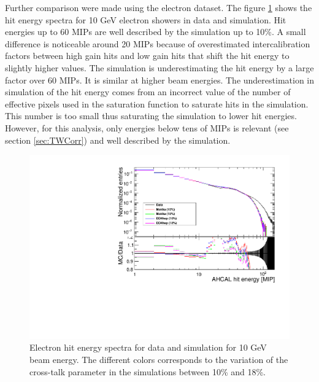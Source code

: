 \documentclass{JINST}
\newcommand\geant{\textsc{Geant\,4}\xspace}
\begin{document}
Further comparison were made using the electron dataset. The figure \ref{fig:HitEnergy10GeVe} shows the hit energy spectra for 10 GeV electron showers in data and simulation. Hit energies up to 60 MIPs are well described by the simulation up to 10\%. A small difference is noticeable around 20 MIPs because of overestimated intercalibration factors between high gain hits and low gain hits that shift the hit energy to slightly higher values. The simulation is underestimating the hit energy by a large factor over 60 MIPs. It is similar at higher beam energies. The underestimation in simulation of the hit energy comes from an incorrect value of the number of effective pixels used in the saturation function to saturate hits in the simulation. This number is too small thus saturating the simulation to lower hit energies. However, for this analysis, only energies below tens of MIPs is relevant (see section \ref{sec:TWCorr}) and well described by the simulation.

\begin{figure}[htbp!]
  \centering
  \includegraphics[width=0.7\linewidth]{fig/HitEnergy_Electrons10GeV.pdf}
  \caption{Electron hit energy spectra for data and simulation for 10 GeV beam energy. The different colors corresponds to the variation of the cross-talk parameter in the simulations between 10\% and 18\%.} \label{fig:HitEnergy10GeVe}
\end{figure}

\end{document}
